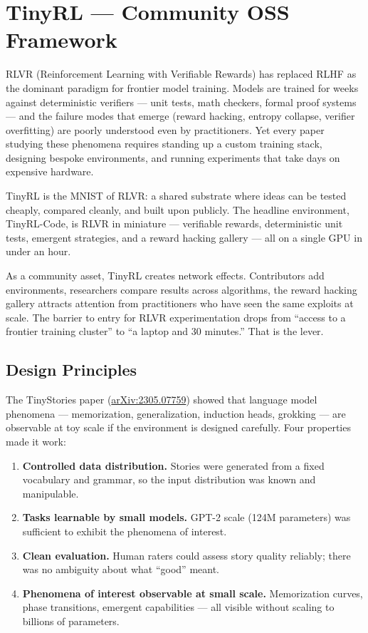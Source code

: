 \section{TinyRL --- Community OSS Framework}

\smallskip

\begin{whythis}
RLVR (Reinforcement Learning with Verifiable Rewards) has replaced RLHF as the dominant paradigm for frontier model training. Models are trained for weeks against deterministic verifiers --- unit tests, math checkers, formal proof systems --- and the failure modes that emerge (reward hacking, entropy collapse, verifier overfitting) are poorly understood even by practitioners. Yet every paper studying these phenomena requires standing up a custom training stack, designing bespoke environments, and running experiments that take days on expensive hardware.

TinyRL is the MNIST of RLVR: a shared substrate where ideas can be tested cheaply, compared cleanly, and built upon publicly. The headline environment, TinyRL-Code, is RLVR in miniature --- verifiable rewards, deterministic unit tests, emergent strategies, and a reward hacking gallery --- all on a single GPU in under an hour.

As a community asset, TinyRL creates network effects. Contributors add environments, researchers compare results across algorithms, the reward hacking gallery attracts attention from practitioners who have seen the same exploits at scale. The barrier to entry for RLVR experimentation drops from ``access to a frontier training cluster'' to ``a laptop and 30 minutes.'' That is the lever.
\end{whythis}

\subsection{Design Principles}

The TinyStories paper (\href{https://arxiv.org/abs/2305.07759}{arXiv:2305.07759}) showed that language model phenomena --- memorization, generalization, induction heads, grokking --- are observable at toy scale if the environment is designed carefully. Four properties made it work:

\begin{enumerate}
  \item \textbf{Controlled data distribution.} Stories were generated from a fixed vocabulary and grammar, so the input distribution was known and manipulable.
  \item \textbf{Tasks learnable by small models.} GPT-2 scale (124M parameters) was sufficient to exhibit the phenomena of interest.
  \item \textbf{Clean evaluation.} Human raters could assess story quality reliably; there was no ambiguity about what ``good'' meant.
  \item \textbf{Phenomena of interest observable at small scale.} Memorization curves, phase transitions, emergent capabilities --- all visible without scaling to billions of parameters.
\end{enumerate}

